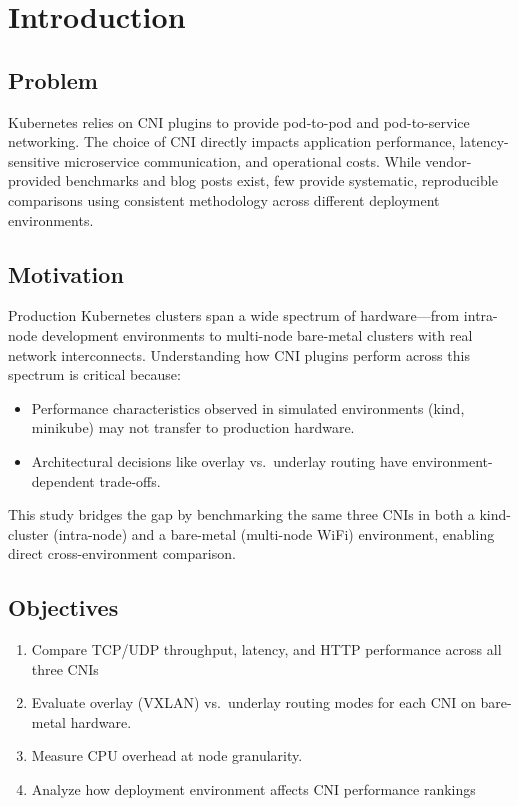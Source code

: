 \documentclass[11pt,a4paper]{article}
\begin{document}
\section{Introduction}

\subsection{Problem}

Kubernetes relies on CNI plugins to provide pod-to-pod and pod-to-service networking. The choice of CNI directly impacts application performance, latency-sensitive microservice communication, and operational costs. While vendor-provided benchmarks and blog posts exist, few provide systematic, reproducible comparisons using consistent methodology across different deployment environments.

\subsection{Motivation}

Production Kubernetes clusters span a wide spectrum of hardware---from intra-node development environments to multi-node bare-metal clusters with real network interconnects. Understanding how CNI plugins perform across this spectrum is critical because:
\begin{itemize}
  \item Performance characteristics observed in simulated environments (kind, minikube) may not transfer to production hardware.
  \item Architectural decisions like overlay vs.\ underlay routing have environment-dependent trade-offs.
\end{itemize}

This study bridges the gap by benchmarking the same three CNIs in both a kind-cluster (intra-node) and a bare-metal (multi-node WiFi) environment, enabling direct cross-environment comparison.

\subsection{Objectives}
\begin{enumerate}
  \item Compare TCP/UDP throughput, latency, and HTTP performance across all three CNIs
  \item Evaluate overlay (VXLAN) vs.\ underlay routing modes for each CNI on bare-metal hardware.
  \item Measure CPU overhead at node granularity.
  \item Analyze how deployment environment affects CNI performance rankings
\end{enumerate}
\end{document}

